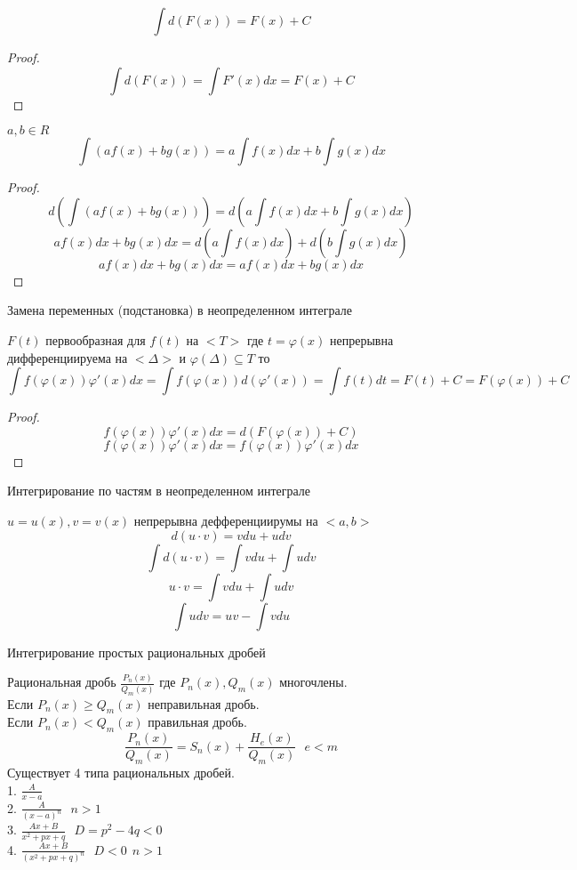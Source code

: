  \[\int d(F(x)) = F(x) + C\]
\begin{proof}
  \[\int d(F(x)) = \int F'(x)dx = F(x) + C\]
\end{proof}


$a, b \in R$\\
\[\int (af(x) + bg(x)) = a \int f(x)dx + b \int g(x)dx\]
\begin{proof}
  $$
  d \left( \int (af(x) + bg(x)) \right) =
  d \left( a \int f(x)dx + b \int g(x)dx \right)
  $$
  $$
  a f(x)dx + b g(x)dx =
  d \left( a \int f(x)dx \right) +
  d \left( b \int g(x)dx \right)
  $$
  $$
  a f(x)dx + b g(x)dx =  a f(x)dx + b g(x)dx
  $$
\end{proof}

\begin{title}[\Large]
  Замена переменных (подстановка) в неопределенном интеграле
\end{title}

\begin{theorem}
  $F(t)$ первообразная для $f(t)$ на $<T>$ где $t = \varphi (x)$
  непрерывна дифференциируема на $<\Delta>$ и $\varphi(\Delta) \subseteq T$ то
  \[
  \int f(\varphi (x)) \varphi'(x)dx =
  \int f(\varphi (x)) d(\varphi'(x)) =
  \int f(t) dt =
  F(t) + C =
  F(\varphi (x)) + C
  \]
\end{theorem}

\begin{proof}
  \[
 f(\varphi(x)) \varphi'(x) dx = d(F(\varphi(x)) + C)
  \]
 \[
 f(\varphi(x)) \varphi'(x) dx = f(\varphi(x)) \varphi'(x) dx
 \]
\end{proof}

\begin{title}[\Large]
  Интегрирование по частям в неопределенном интеграле
\end{title}
$u = u(x), v = v(x)$ непрерывна дефференциирумы на $<a,b>$
$$d(u\cdot v) = v du + u dv$$
$$\int d(u \cdot v) = \int v du + \int u dv$$
$$u\cdot v = \int vdu + \int udv$$
\[\int udv = uv - \int vdu\]

\begin{title}[\Large]
  Интегрирование простых рациональных дробей
\end{title}
Рациональная дробь $\frac{P_n(x)}{Q_m(x)}$ где $P_n(x), Q_m(x)$ многочлены.\\
Если $P_n(x) \ge Q_m(x)$ неправильная дробь.\\
Если $P_n(x) < Q_m(x)$ правильная дробь.
$$
\frac{P_n(x)}{Q_m(x)} = S_n(x) + \frac{H_e(x)}{Q_m(x)} ~~~ e < m
$$
Существует 4 типа рациональных дробей.\\
1. $\frac{A}{x-a}$\\
2. $\frac{A}{(x-a)^n} ~~~ n > 1$\\
3. $\frac{Ax + B}{x^2 + px +q} ~~~ D = p^2 - 4q < 0$\\
4. $\frac{Ax + B}{(x^2 + px +q)^n} ~~~ D < 0 ~~ n > 1$\\

